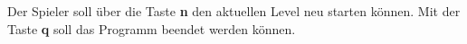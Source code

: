 Der Spieler soll \"uber die Taste \textbf{n} den aktuellen Level neu 
starten k\"onnen. Mit der Taste \textbf{q} soll das Programm beendet werden k\"onnen.
